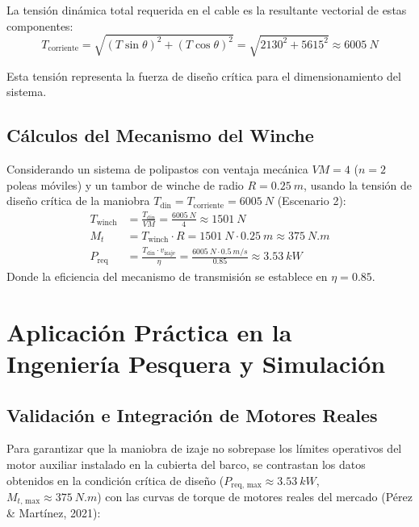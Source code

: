 \documentclass[11pt,a4paper]{article}
\begin{document}
La tensión dinámica total requerida en el cable es la resultante vectorial de estas componentes:
\begin{equation}\label{eq:tension_corriente_total}
T_{\text{corriente}} = \sqrt{(T\sin\theta)^2 + (T\cos\theta)^2} = \sqrt{2130^2 + 5615^2} \approx \SI{6005}{N}
\end{equation}

Esta tensión representa la fuerza de diseño crítica para el dimensionamiento del sistema.

\subsection{Cálculos del Mecanismo del Winche}
\begin{physbox}[title=Ecuaciones de Potencia y Torque del Sistema de Izaje]
Considerando un sistema de polipastos con ventaja mecánica $VM = 4$ ($n=2$ poleas móviles) y un tambor de winche de radio $R = \SI{0.25}{m}$, usando la tensión de diseño crítica de la maniobra $T_{\text{din}} = T_{\text{corriente}} = \SI{6005}{N}$ (Escenario 2):
\begin{align}
    T_{\text{winch}} &= \frac{T_{\text{din}}}{VM} = \frac{\SI{6005}{N}}{4} \approx \SI{1501}{N} \label{eq:tension_winch} \\
    M_t &= T_{\text{winch}} \cdot R = \SI{1501}{N} \cdot \SI{0.25}{m} \approx \SI{375}{N.m} \label{eq:torque_winch} \\
    P_{\text{req}} &= \frac{T_{\text{din}} \cdot v_{\text{izaje}}}{\eta} = \frac{\SI{6005}{N} \cdot \SI{0.5}{m/s}}{0.85} \approx \SI{3.53}{kW} \label{eq:potencia_winch}
\end{align}
Donde la eficiencia del mecanismo de transmisión se establece en $\eta = 0.85$.
\end{physbox}

\section{Aplicación Práctica en la Ingeniería Pesquera y Simulación}

\subsection{Validación e Integración de Motores Reales}
Para garantizar que la maniobra de izaje no sobrepase los límites operativos del motor auxiliar instalado en la cubierta del barco, se contrastan los datos obtenidos en la condición crítica de diseño ($P_{\text{req, max}} \approx \SI{3.53}{kW}$, $M_{t\text{, max}} \approx \SI{375}{N.m}$) con las curvas de torque de motores reales del mercado (Pérez \& Martínez, 2021):
\end{document}
